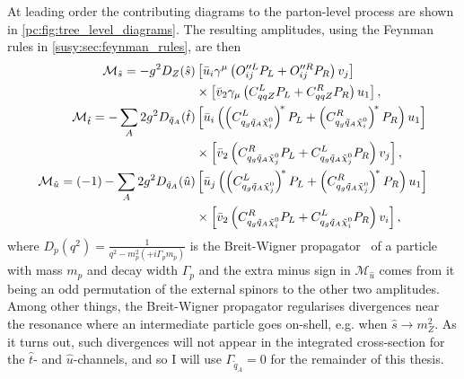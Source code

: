 \documentclass[../main.tex]{subfiles}
\begin{document}
At leading order the contributing diagrams to the parton-level process are shown in \cref{pc:fig:tree_level_diagrams}.
The resulting amplitudes, using the Feynman rules in \cref{susy:sec:feynman_rules}, are then
\begin{subequations}
  \begin{align}
    \nonumber
    \M_{\hat{s}} = -g^2 D_Z(\hat{s})                         & \bclosed{ \bar{u}_i\gamma^\mu\pclosed{O^{\prime\prime L}_{ij}P_L + O^{\prime\prime R}_{ij}P_R} v_j }                                              \\
    \label{pc:eq:Ms}
                                                             & \times \bclosed{ \bar{v}_2 \gamma_\mu \pclosed{C^L_{qqZ}P_L + C^R_{qqZ}P_R} u_1 },                                                                \\
    \nonumber
    \M_{\hat{t}} = -\sum_A 2g^2 D_{\tilde{q}_A}(\hat{t})     & \bclosed{ \bar{u}_i \pclosed{\pclosed{C_{q_g \tilde{q}_A \nino[i]}^L}^{\!\ast} P_L + \pclosed{C_{q_g \tilde{q}_A \nino[i]}^R}^{\!\ast} P_R} u_1 } \\
    \label{pc:eq:Mt}
                                                             & \times \bclosed{ \bar{v}_2 \pclosed{C_{q_g \tilde{q}_A \nino[j]}^R P_L + C_{q_g \tilde{q}_A \nino[j]}^L P_R} v_j },                               \\
    \nonumber
    \M_{\hat{u}} = (-1)-\sum_A 2g^2 D_{\tilde{q}_A}(\hat{u}) & \bclosed{ \bar{u}_j \pclosed{\pclosed{C_{q_g \tilde{q}_A \nino[j]}^L}^{\!\ast} P_L + \pclosed{C_{q_g \tilde{q}_A \nino[j]}^R}^{\!\ast} P_R} u_1 } \\
    \label{pc:eq:Mu}
                                                             & \times \bclosed{ \bar{v}_2 \pclosed{C_{q_g \tilde{q}_A \nino[i]}^R P_L + C_{q_g \tilde{q}_A \nino[i]}^L P_R} v_i },
  \end{align}
\end{subequations}
where \(D_p(q^2) = \frac{1}{q^2 - m_p^2 (+ i\Gamma_p m_p)}\) is the
Breit-Wigner propagator~\cite{Schwartz:2014sze} of a particle with mass \(m_p\) and decay
width \(\Gamma_p\) and the extra minus sign in \(\mathcal{M}_{\hat{u}}\) comes from it being an odd permutation of the external spinors to the other two amplitudes.
Among other things, the Breit-Wigner propagator regularises divergences near the resonance where an intermediate particle goes on-shell, e.g. when \(\hat{s} \to m_Z^2\).
As it turns out, such divergences will not appear in the integrated cross-section for the \(\hat{t}\)- and \(\hat{u}\)-channels, and so I will use \(\Gamma_{\tilde{q}_A} = 0\) for the remainder of this thesis.
\\
\end{document}
